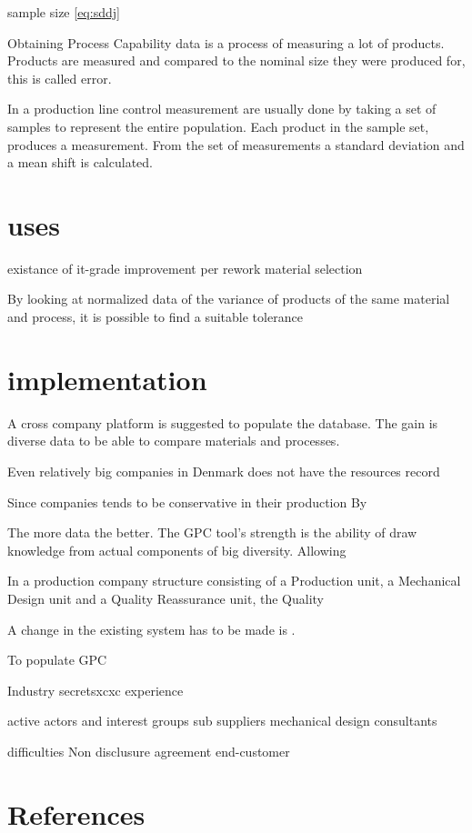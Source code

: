 \documentclass[aip,amsmath, reprint, author-year]{revtex4-1}
\begin{document}
sample size  \ref{eq:sddj}




Obtaining Process Capability data is a process of measuring a lot of products.
Products are measured and compared to the nominal size they were produced for, this is called error.

In a production line control measurement are usually done by taking a set of samples to represent the entire population. Each product in the sample set, produces a measurement. From the set of measurements a standard deviation and a mean shift is calculated.

\section{uses}
existance of it-grade
improvement per rework
material selection





By looking at normalized data of the variance of products of the same material and process, it is possible to find a suitable tolerance

\section{implementation}





A cross company platform is suggested to populate the database. The gain is diverse data to be able to compare materials and processes. 

Even relatively big companies in Denmark does not have the resources record 

Since companies tends to be conservative in their production 
By 

The more data the better. The GPC tool's strength is the ability of draw knowledge from actual components of big diversity. Allowing  

In a production company structure consisting of a Production unit, a Mechanical Design unit and a Quality Reassurance unit, the Quality 

A change in the existing system has to be made is .
 

\cite{perzyk1998selection}

To populate GPC 

Industry secretsxcxc
	experience
	
	
active actors and interest groups
	sub suppliers 
	mechanical design consultants
	

difficulties
	Non disclusure agreement
	end-customer
	

\section*{References}

\end{document}
